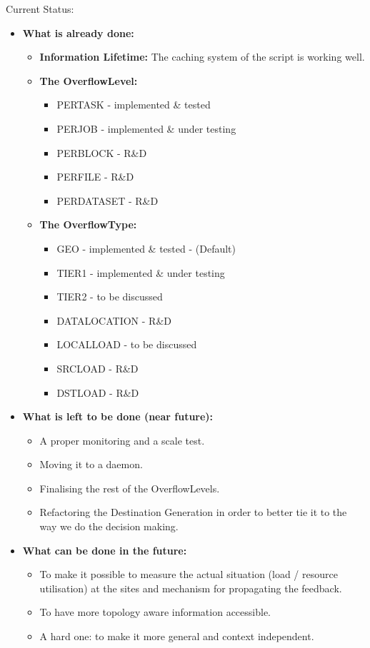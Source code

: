 \documentclass[8pt,mathserif,a4paper,oneside,pdf]{beamer}
\begin{document}
\begin{frame}[fragile]{Current Status:}
  \begin{itemize}
  \item
   \textbf{What is already done:}
    \begin{itemize}
    \item
      \textbf{Information Lifetime:}
      The caching system of the script is working well.\\
    \item
      \textbf{The OverflowLevel:}
      \begin{itemize}
      \item
        PERTASK - implemented \& tested
      \item
        PERJOB - implemented \& under testing
      \item
        PERBLOCK - R\&D
      \item
        PERFILE - R\&D
      \item
        PERDATASET - R\&D
      \end{itemize}
    \item
      \textbf{The OverflowType:}
      \begin{itemize}
      \item
        GEO - implemented \& tested - (Default)
      \item
        TIER1 - implemented \& under testing
      \item
        TIER2 - to be discussed
      \item
        DATALOCATION - R\&D
      \item
        LOCALLOAD - to be discussed
      \item
        SRCLOAD - R\&D
      \item
        DSTLOAD - R\&D
      \end{itemize}
    \end{itemize}
  \item
    \textbf{What is left to be done (near future):}
    \begin{itemize}
    \item
      A proper monitoring and a scale test.
    \item
      Moving it to a daemon.
    \item
      Finalising the rest of the OverflowLevels.
    \item
      Refactoring the Destination Generation in order to better tie it to the way we do the decision making.
    \end{itemize}
  \item
    \textbf{What can be done in the future:}
    \begin{itemize}
    \item
      To make it possible to measure the actual situation (load / resource utilisation) at the sites  and mechanism for propagating the feedback.
    \item
      To have more topology aware information accessible.
    \item
      A hard one: to make it more general and context independent.
    \end{itemize}
  \end{itemize}


\end{frame}
\end{document}
